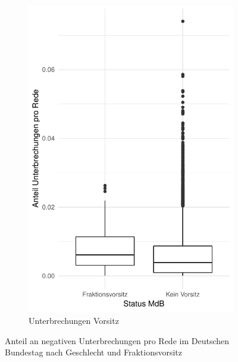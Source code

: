 \documentclass[12pt, 
    twoside=false, 
    bibliography=totoc, 
    numbers=endperiod, 
    headings=normal, 
    toc=chapterentrydotfill
    ]{scrbook}
\begin{document}
\begin{figure}[H]
\begin{subfigure}{.5\textwidth}
      \includegraphics[width=.9\linewidth]{document/images/boxplot_unterbrechung_vorsitz.pdf}
      \caption{Unterbrechungen Vorsitz}
      \label{fig:boxplot_unterbrechung_vorsitz}
    \end{subfigure}
    \caption[Anteil an negativen Unterbrechungen pro Rede im Deutschen Bundestag]{Anteil an negativen Unterbrechungen pro Rede im Deutschen Bundestag nach Geschlecht und Fraktionsvorsitz}
    \label{fig:boxplot_unterbrechung}
\end{figure}

\end{document}
